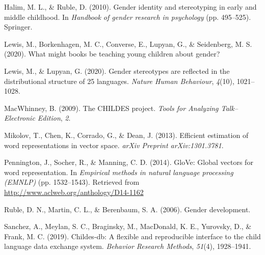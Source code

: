 \documentclass[10pt, letterpaper]{article}
\newenvironment{CSLReferences}%
  {}%
  {\par}
\begin{document}
\begin{CSLReferences}{1}{0}
\leavevmode{}%
Halim, M. L., \& Ruble, D. (2010). Gender identity and stereotyping in
early and middle childhood. In \emph{Handbook of gender research in
psychology} (pp. 495--525). Springer.

\leavevmode{}%
Lewis, M., Borkenhagen, M. C., Converse, E., Lupyan, G., \& Seidenberg,
M. S. (2020). What might books be teaching young children about gender?

\leavevmode{}%
Lewis, M., \& Lupyan, G. (2020). Gender stereotypes are reflected in the
distributional structure of 25 languages. \emph{Nature Human Behaviour},
\emph{4}(10), 1021--1028.

\leavevmode{}%
MacWhinney, B. (2009). The CHILDES project. \emph{Tools for Analyzing
Talk--Electronic Edition}, \emph{2}.

\leavevmode{}%
Mikolov, T., Chen, K., Corrado, G., \& Dean, J. (2013). Efficient
estimation of word representations in vector space. \emph{arXiv Preprint
arXiv:1301.3781}.

\leavevmode{}%
Pennington, J., Socher, R., \& Manning, C. D. (2014). GloVe: Global
vectors for word representation. In \emph{Empirical methods in natural
language processing (EMNLP)} (pp. 1532--1543). Retrieved from
\url{http://www.aclweb.org/anthology/D14-1162}

\leavevmode{}%
Ruble, D. N., Martin, C. L., \& Berenbaum, S. A. (2006). Gender
development.

\leavevmode{}%
Sanchez, A., Meylan, S. C., Braginsky, M., MacDonald, K. E., Yurovsky,
D., \& Frank, M. C. (2019). Childes-db: A flexible and reproducible
interface to the child language data exchange system. \emph{Behavior
Research Methods}, \emph{51}(4), 1928--1941.

\end{CSLReferences}


\end{document}

